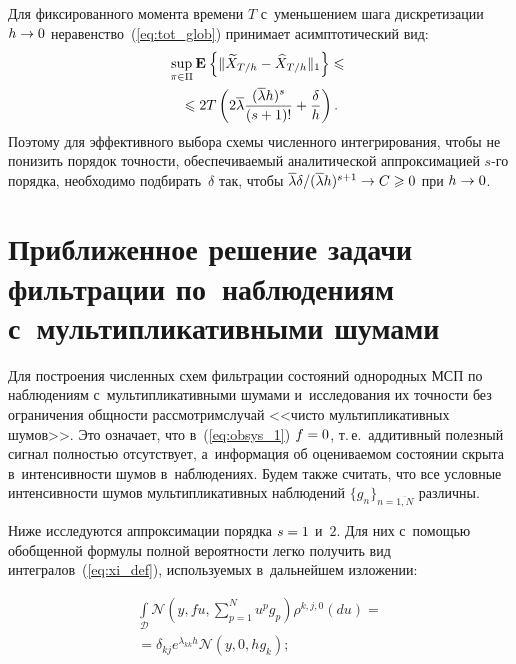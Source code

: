 \begin{multicols}{2}
 Для фиксированного момента времени $T$ с~уменьшением шага дискретизации 
$h \hm\to 0$ неравенство~(\ref{eq:tot_glob}) принимает асимптотический 
вид:
 \begin{multline}
\sup\limits_{\pi \in \Pi}\mathbf{E}_{  }\left\{ \mathop{\|\widetilde{X}_{T/h} - 
\widehat{X}_{T/h}\|_1} \right\}
\leqslant{}\\
{}\leqslant
2T\left(2\overline{\lambda} \displaystyle\frac{\displaystyle (\overline{\lambda}h)^s\mathstrut}{\displaystyle (s+1)!\mathstrut}+
 \displaystyle\frac{\displaystyle \delta\mathstrut}{\displaystyle h\mathstrut}\right).
 \label{eq:asympt_glob}
\end{multline}
Поэтому для эффективного выбора схемы численного интегрирования,
чтобы не понизить порядок точности, обеспечиваемый аналитической 
аппроксимацией $s$-го порядка,
необходимо подбирать~$\delta$ так, чтобы 
${\overline{\lambda}\delta}/{(\overline{\lambda}h)^{s+1}}\hm \to C 
\hm\geqslant 0$ при $h \hm\to 0$.

 \section{Приближенное решение задачи фильтрации по~наблюдениям 
с~мультипликативными шумами}

\vspace*{-2pt}

 Для построения численных схем фильтрации состояний однородных МСП по 
наблюдениям с~мультипликативными шумами и~исследования их точности без 
ограничения общности рассмотрим\linebreak случай <<чисто мультипликативных шумов>>. 
Это означает, что в~(\ref{eq:obsys_1}) $f\hm=0$, т.\,е.\ аддитивный 
полезный сигнал полностью отсутствует, а~информация об оцениваемом 
состоянии скрыта в~интенсивности шумов в~наблюдениях. Будем также 
считать, что все условные интенсивности шумов мультипликативных 
наблюдений $\{g_n\}_{n=\overline{1,N}}$ различны.

 Ниже исследуются аппроксимации порядка $s\hm=1$ и~$2$. Для них 
с~помощью обобщенной формулы полной вероятности легко получить вид 
интегралов~(\ref{eq:xi_def}), используемых в~дальнейшем изложении:

\noindent
 \begin{multline} %
 \int\limits_{\mathcal{D}} \mathcal{N}\left(y,f u,\sum\limits_{p=1}^N u^p 
g_p\right) \rho^{k,j,0}(du) ={}\\
{}=
 \delta_{kj}e^{\lambda_{kk}h} \mathcal{N}\left(y,0 ,h g_k\right);
 \label{eq:h0}
 \end{multline}
 
 \vspace*{-12pt}
 

\end{multicols}
